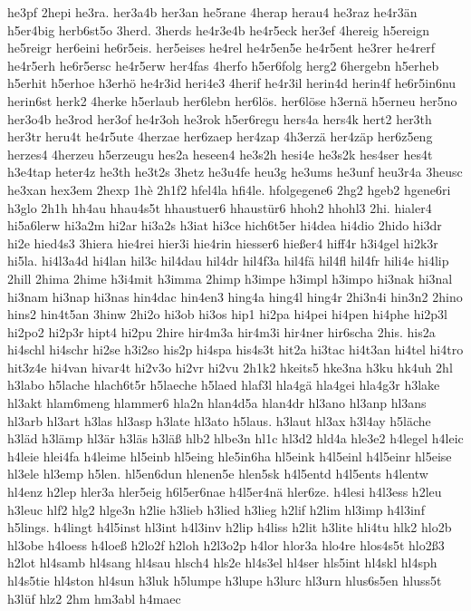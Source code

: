 {he3pf
2hepi
he3ra.
her3a4b
her3an
he5rane
4herap
herau4
he3raz
he4r3än
h5er4big
herb6st5o
3herd.
3herds
he4r3e4b
he4r5eck
her3ef
4hereig
h5ereign
he5reigr
her6eini
he6r5eis.
her5eises
he4rel
he4r5en5e
he4r5ent
he3rer
he4rerf
he4r5erh
he6r5ersc
he4r5erw
her4fas
4herfo
h5er6folg
herg2
6hergebn
h5erheb
h5erhit
h5erhoe
h3erhö
he4r3id
heri4e3
4herif
he4r3il
herin4d
herin4f
he6r5in6nu
herin6st
herk2
4herke
h5erlaub
her6lebn
her6lös.
her6löse
h3ernä
h5erneu
her5no
her3o4b
he3rod
her3of
he4r3oh
he3rok
h5er6regu
hers4a
hers4k
hert2
her3th
her3tr
heru4t
he4r5ute
4herzae
her6zaep
her4zap
4h3erzä
her4zäp
her6z5eng
herzes4
4herzeu
h5erzeugu
hes2a
heseen4
he3s2h
hesi4e
he3s2k
hes4ser
hes4t
h3e4tap
heter4z
he3th
he3t2s
3hetz
he3u4fe
heu3g
he3ums
he3unf
heu3r4a
3heusc
he3xan
hex3em
2hexp
1hè
2h1f2
hfel4la
hfi4le.
hfolgegene6
2hg2
hgeb2
hgene6ri
h3glo
2h1h
hh4au
hhau4s5t
hhaustuer6
hhaustür6
hhoh2
hhohl3
2hi.
hialer4
hi5a6lerw
hi3a2m
hi2ar
hi3a2s
h3iat
hi3ce
hich6t5er
hi4dea
hi4dio
2hido
hi3dr
hi2e
hied4s3
3hiera
hie4rei
hier3i
hie4rin
hiesser6
hießer4
hiff4r
h3i4gel
hi2k3r
hi5la.
hi4l3a4d
hi4lan
hil3c
hil4dau
hil4dr
hil4f3a
hil4fä
hil4fl
hil4fr
hili4e
hi4lip
2hill
2hima
2hime
h3i4mit
h3imma
2himp
h3impe
h3impl
h3impo
hi3nak
hi3nal
hi3nam
hi3nap
hi3nas
hin4dac
hin4en3
hing4a
hing4l
hing4r
2hi3n4i
hin3n2
2hino
hins2
hin4t5an
3hinw
2hi2o
hi3ob
hi3os
hip1
hi2pa
hi4pei
hi4pen
hi4phe
hi2p3l
hi2po2
hi2p3r
hipt4
hi2pu
2hire
hir4m3a
hir4m3i
hir4ner
hir6scha
2his.
his2a
hi4schl
hi4schr
hi2se
h3i2so
his2p
hi4spa
his4s3t
hit2a
hi3tac
hi4t3an
hi4tel
hi4tro
hit3z4e
hi4van
hivar4t
hi2v3o
hi2vr
hi2vu
2h1k2
hkeits5
hke3na
h3ku
hk4uh
2hl
h3labo
h5lache
hlach6t5r
h5laeche
h5laed
hlaf3l
hla4gä
hla4gei
hla4g3r
h3lake
hl3akt
hlam6meng
hlammer6
hla2n
hlan4d5a
hlan4dr
hl3ano
hl3anp
hl3ans
hl3arb
hl3art
h3las
hl3asp
h3late
hl3ato
h5laus.
h3laut
hl3ax
h3l4ay
h5läche
h3läd
h3lämp
hl3är
h3läs
h3läß
hlb2
hlbe3n
hl1c
hl3d2
hld4a
hle3e2
h4legel
h4leic
h4leie
hlei4fa
h4leime
hl5einb
hl5eing
hle5in6ha
hl5eink
h4l5einl
h4l5einr
hl5eise
hl3ele
hl3emp
h5len.
hl5en6dun
hlenen5e
hlen5sk
h4l5entd
h4l5ents
h4lentw
hl4enz
h2lep
hler3a
hler5eig
h6l5er6nae
h4l5er4nä
hler6ze.
h4lesi
h4l3ess
h2leu
h3leuc
hlf2
hlg2
hlge3n
h2lie
h3lieb
h3lied
h3lieg
h2lif
h2lim
hl3imp
h4l3inf
h5lings.
h4lingt
h4l5inst
hl3int
h4l3inv
h2lip
h4liss
h2lit
h3lite
hli4tu
hlk2
hlo2b
hl3obe
h4loess
h4loeß
h2lo2f
h2loh
h2l3o2p
h4lor
hlor3a
hlo4re
hlos4s5t
hlo2ß3
h2lot
hl4samb
hl4sang
hl4sau
hlsch4
hls2e
hl4s3el
hl4ser
hls5int
hl4skl
hl4sph
hl4s5tie
hl4ston
hl4sun
h3luk
h5lumpe
h3lupe
h3lurc
hl3urn
hlus6s5en
hluss5t
h3lüf
hlz2
2hm
hm3abl
h4maec
}
